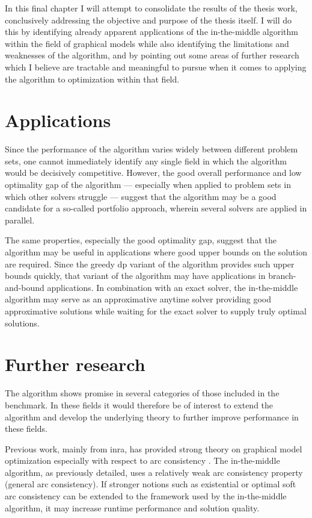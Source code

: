 In this final chapter I will attempt to consolidate the results of the thesis work, conclusively addressing the objective and purpose of the thesis itself.
I will do this by identifying already apparent applications of the in-the-middle algorithm within the field of graphical models while also identifying the limitations and weaknesses of the algorithm, and by pointing out some areas of further research which I believe are tractable and meaningful to pursue when it comes to applying the algorithm to optimization within that field.

\section{Applications}
Since the performance of the algorithm varies widely between different problem sets, one cannot immediately identify any single field in which the algorithm would be decisively competitive.
However, the good overall performance and low optimality gap of the algorithm --- especially when applied to problem sets in which other solvers struggle --- suggest that the algorithm may be a good candidate for a so-called portfolio approach, wherein several solvers are applied in parallel.

The same properties, especially the good optimality gap, suggest that the algorithm may be useful in applications where good upper bounds on the solution are required.
Since the greedy \gls{dp} variant of the algorithm provides such upper bounds quickly, that variant of the algorithm may have applications in branch-and-bound applications.
In combination with an exact solver, the in-the-middle algorithm may serve as an approximative anytime solver providing good approximative solutions while waiting for the exact solver to supply truly optimal solutions.


\section{Further research}
The algorithm shows promise in several categories of those included in the benchmark.
In these fields it would therefore be of interest to extend the algorithm and develop the underlying theory to further improve performance in these fields.

Previous work, mainly from \gls{inra}, has provided strong theory on graphical model optimization especially with respect to arc consistency \parencite{Cooper10,Cooper08,deGivry06,deGivry05}.
The in-the-middle algorithm, as previously detailed, uses a relatively weak arc consistency property (general arc consistency).
If stronger notions such as existential \parencite{deGivry05} or optimal soft \parencite{Cooper10} arc consistency can be extended to the framework used by the in-the-middle algorithm, it may increase runtime performance and solution quality.

